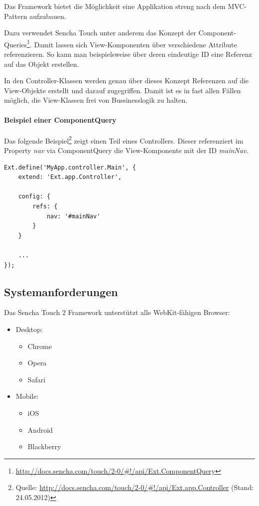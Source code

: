 Das Framework bietet die Möglichkeit eine Applikation streng nach dem MVC-Pattern aufzubauen.

Dazu verwendet Sencha Touch unter anderem das Konzept der Component-Queries\footnote{\url{http://docs.sencha.com/touch/2-0/\#!/api/Ext.ComponentQuery}}. Damit lassen sich View-Komponenten über verschiedene Attribute referenzieren. So kann man beispielsweise über deren eindeutige ID eine Referenz auf das Objekt erstellen.

In den Controller-Klassen werden genau über dieses Konzept Referenzen auf die View-Objekte erstellt und darauf zugegriffen. Damit ist es in fast allen Fällen möglich, die View-Klassen frei von Bussinesslogik zu halten.

\paragraph{Beispiel einer ComponentQuery}
Das folgende Beispiel\footnote{Quelle: \url{http://docs.sencha.com/touch/2-0/\#!/api/Ext.app.Controller} (Stand: 24.05.2012)} zeigt einen Teil eines Controllers. Dieser referenziert im Property \emph{nav} via ComponentQuery die View-Komponente mit der ID \emph{mainNav}.

\lstset{language=JavaScript}
\begin{lstlisting}[caption=ComponentQuery in Sencha Touch 2, label=st2-componentquery]
Ext.define('MyApp.controller.Main', {
	extend: 'Ext.app.Controller',
	
	config: {
		refs: {
			nav: '#mainNav'
		}
	}
	
	...
});
\end{lstlisting}

\subsection{Systemanforderungen}
Das Sencha Touch 2 Framework unterstützt alle WebKit-fähigen Browser:

\begin{itemize}
\item Desktop:
\begin{itemize}
	\item Chrome
	\item Opera
	\item Safari
\end{itemize}

\item Mobile:
\begin{itemize}
	\item iOS
	\item Android
	\item Blackberry
\end{itemize}
\end{itemize}

